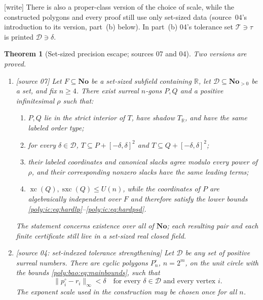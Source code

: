 \documentclass[11pt,a4paper]{article}
\numberwithin{equation}{section}
\newtheorem{theorem}{Theorem}[section]
\theoremstyle{plain}
\newcommand{\wtag}{\textup{[write]}}%
\newcommand{\srcnote}[1]{\textup{[#1]}}%
\newcommand{\No}{\mathbf{No}}
\newcommand{\R}{\mathbb R}
\newcommand{\xc}{\operatorname{xc}}
\newcommand{\sx}{\operatorname{sxc}}
\newcommand{\boxrad}[1]{[-#1,#1]^2}
\begin{document}
\wtag{} There is also a proper-class version of the choice of scale, while the
constructed polygons and every proof still use only set-sized data
(source~04's introduction to its version, part~(b) below). In part~(b) 04's
tolerance set $\mathcal T\ni\tau$ is printed $\mathcal D\ni\delta$.

\begin{theorem}[Set-sized precision escape; sources 07 and 04]\label{poly:ic:thm:precision}\label{poly:bao:thm:tolerances}
Two versions are proved.
\begin{enumerate}[label=\textnormal{(\alph*)},leftmargin=*,itemsep=3pt]
\item \srcnote{source 07}
Let $F\subseteq\No$ be a set-sized subfield containing $\R$, let
$\mathcal D\subseteq\No_{>0}$ be a set, and fix $n\geq4$. There exist
surreal $n$-gons $P,Q$ and a positive infinitesimal $\rho$ such that:
\begin{enumerate}[label=\textnormal{(\roman*)},leftmargin=*,itemsep=3pt]
\item $P,Q$ lie in the strict interior of $T$, have shadow $T_\R$, and
have the same labeled order type;
\item for every $\delta\in\mathcal D$,
$T\subseteq P+\boxrad{\delta}$ and $T\subseteq Q+\boxrad{\delta}$;
\item their labeled coordinates and canonical slacks agree modulo every
power of $\rho$, and their corresponding nonzero slacks have the same
leading terms;
\item $\xc(Q),\sx(Q)\leq U(n)$, while the coordinates of $P$ are
algebraically independent over $F$ and therefore satisfy the lower bounds
\eqref{poly:ic:eq:hardlp}--\eqref{poly:ic:eq:hardpsd}.
\end{enumerate}
The statement concerns existence over all of $\No$; each resulting pair
and each finite certificate still live in a set-sized real closed field.
\item \srcnote{source 04: set-indexed tolerance strengthening}
Let $\mathcal D$ be any set of positive surreal numbers. There are cyclic
polygons $P^\circ_n$, $n=2^m$, on the unit circle with the bounds
\eqref{poly:bao:eq:mainbounds}, such that
\[
 \|p^\circ_i-r_i\|_\infty<\delta
 \quad\text{for every }\delta\in\mathcal D
 \text{ and every vertex }i.
\]
The exponent scale used in the construction may be chosen once for all
$n$.
\end{enumerate}
\end{theorem}
\end{document}
